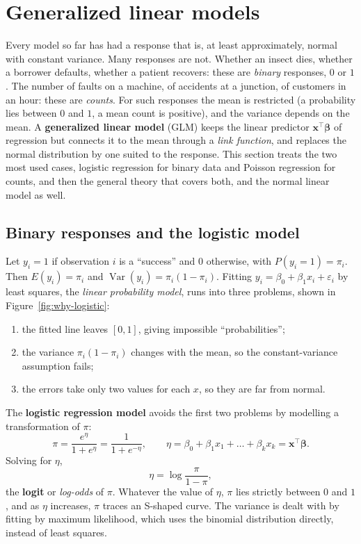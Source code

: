 \documentclass[11pt,a4paper]{article}
\numberwithin{equation}{section}
\theoremstyle{definition}
\begin{document}
\section{Generalized linear models}
Every model so far has had a response that is, at least approximately, normal with constant variance.
Many responses are not. Whether an insect dies, whether a borrower defaults, whether a patient recovers:
these are \emph{binary} responses, $0$ or $1$. The number of faults on a machine, of accidents at a junction,
of customers in an hour: these are \emph{counts}. For such responses the mean is restricted (a probability
lies between $0$ and $1$, a mean count is positive), and the variance depends on the mean. A
\textbf{generalized linear model} (GLM) keeps the linear predictor $\mathbf{x}^\top\boldsymbol\beta$ of regression but
connects it to the mean through a \emph{link function}, and replaces the normal distribution by one suited to
the response. This section treats the two most used cases, logistic regression for binary data and
Poisson regression for counts, and then the general theory that covers both, and the normal linear model
as well.

\subsection{Binary responses and the logistic model}
Let $y_i = 1$ if observation $i$ is a ``success'' and $0$ otherwise, with $P(y_i = 1) = \pi_i$. Then
$E(y_i) = \pi_i$ and $\operatorname{Var}(y_i) = \pi_i(1 - \pi_i)$. Fitting $y_i = \beta_0 + \beta_1x_i + \varepsilon_i$ by least squares, the
\emph{linear probability model}, runs into three problems, shown in Figure~\ref{fig:why-logistic}:
\begin{enumerate}[label=(\arabic*)]
\item the fitted line leaves $[0, 1]$, giving impossible ``probabilities'';
\item the variance $\pi_i(1 - \pi_i)$ changes with the mean, so the constant-variance assumption fails;
\item the errors take only two values for each $x$, so they are far from normal.
\end{enumerate}
The \textbf{logistic regression model} avoids the first two problems by modelling a transformation of $\pi$:
\[
\pi = \frac{e^{\eta}}{1 + e^{\eta}} = \frac{1}{1 + e^{-\eta}}, \qquad \eta = \beta_0 + \beta_1x_1 + \dots + \beta_kx_k = \mathbf{x}^\top\boldsymbol\beta .
\]
Solving for $\eta$,
\[
\eta = \log\frac{\pi}{1 - \pi} ,
\]
the \textbf{logit} or \emph{log-odds} of $\pi$. Whatever the value of $\eta$, $\pi$ lies strictly between $0$ and $1$, and as $\eta$
increases, $\pi$ traces an S-shaped curve. The variance is dealt with by fitting by maximum likelihood, which
uses the binomial distribution directly, instead of least squares.
\end{document}
